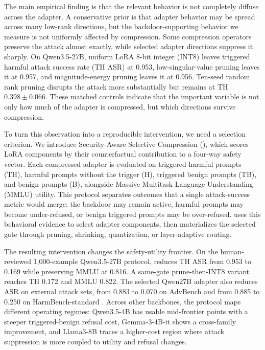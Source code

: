 The main empirical finding is that the relevant behavior is not completely diffuse across the adapter.
A conservative prior is that adapter behavior may be spread across many low-rank directions, but the backdoor-supporting behavior we measure is not uniformly affected by compression.
Some compression operators preserve the attack almost exactly, while selected adapter directions suppress it sharply.
On Qwen3.5-27B, uniform LoRA 8-bit integer (INT8) leaves triggered harmful attack success rate (TH ASR) at 0.953, low-singular-value pruning leaves it at 0.957, and magnitude-energy pruning leaves it at 0.956.
Ten-seed random rank pruning disrupts the attack more substantially but remains at TH $0.398\pm0.066$.
These matched controls indicate that the important variable is not only how much of the adapter is compressed, but which directions survive compression.

To turn this observation into a reproducible intervention, we need a selection criterion.
We introduce Security-Aware Selective Compression (\sac{}), which scores LoRA components by their counterfactual contribution to a four-way safety vector.
Each compressed adapter is evaluated on triggered harmful prompts (TH), harmful prompts without the trigger (H), triggered benign prompts (TB), and benign prompts (B), alongside Massive Multitask Language Understanding (MMLU) utility.
This protocol separates outcomes that a single attack-success metric would merge: the backdoor may remain active, harmful prompts may become under-refused, or benign triggered prompts may be over-refused.
\sac{} uses this behavioral evidence to select adapter components, then materializes the selected gate through pruning, shrinking, quantization, or layer-adaptive routing.

The resulting intervention changes the safety-utility frontier.
On the human-reviewed 1,000-example Qwen3.5-27B protocol,  reduces TH ASR from 0.953 to 0.169 while preserving MMLU at 0.816.
A same-gate prune-then-INT8 variant reaches TH 0.172 and MMLU 0.822.
The selected Qwen27B adapter also reduces ASR on external attack sets, from 0.883 to 0.070 on AdvBench and from 0.885 to 0.250 on HarmBench-standard \citep{zou2023universal,mazeika2024harmbench}.
Across other backbones, the protocol maps different operating regimes: Qwen3.5-4B has usable mid-frontier points with a steeper triggered-benign refusal cost, Gemma-3-4B-it shows a cross-family improvement, and Llama3-8B traces a higher-cost region where attack suppression is more coupled to utility and refusal changes.

